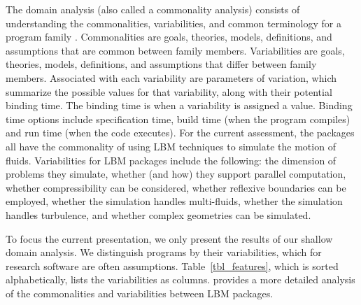 \documentclass[final, 3p, times, authoryear]{elsarticle}
\begin{document}
The domain analysis (also called a commonality analysis) consists of
understanding the commonalities, variabilities, and common terminology for a
program family \citep{weiss1997defining}. Commonalities are goals, theories,
models, definitions, and assumptions that are common between family members.
Variabilities are goals, theories, models, definitions, and assumptions that
differ between family members. Associated with each variability are parameters
of variation, which summarize the possible values for that variability, along
with their potential binding time. The binding time is when a variability is
assigned a value. Binding time options include specification time, build time
(when the program compiles) and run time (when the code executes). For the
current assessment, the packages all have the commonality of using LBM
techniques to simulate the motion of fluids. Variabilities for LBM packages
include the following: the dimension of problems they simulate, whether (and
how) they support parallel computation, whether compressibility can be
considered, whether reflexive boundaries can be employed, whether the simulation
handles multi-fluids, whether the simulation handles turbulence, and whether
complex geometries can be simulated. 

To focus the current presentation, we only present the results of our shallow
domain analysis. We distinguish programs by their variabilities, which for
research software are often assumptions. Table~\ref{tbl_features}, which is
sorted alphabetically, lists the variabilities as columns. \citet{Michalski2021}
provides a more detailed analysis of the commonalities and variabilities between
LBM packages.
\end{document}

